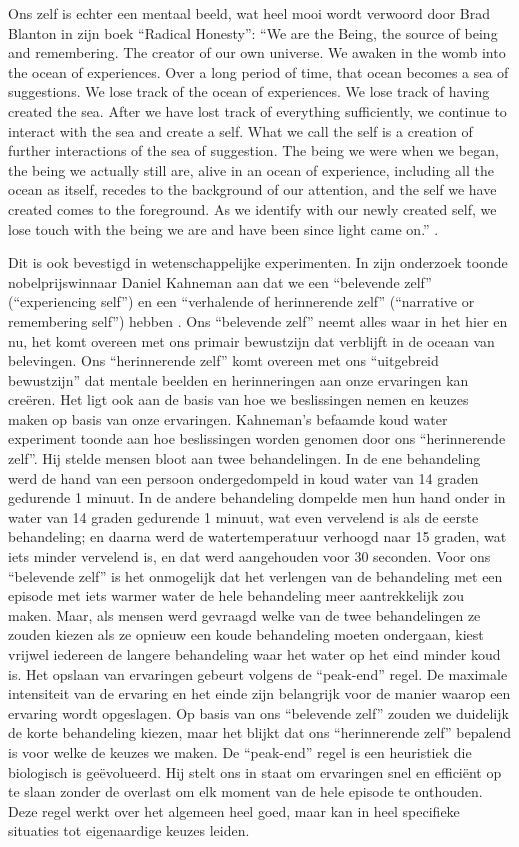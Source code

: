 \documentclass[
  11pt,
]{book}
\begin{document}
Ons zelf is echter een mentaal beeld, wat heel mooi wordt verwoord door Brad Blanton in zijn boek ``Radical Honesty'': ``We are the Being, the source of being and remembering. The creator of our own universe. We awaken in the womb into the ocean of experiences. Over a long period of time, that ocean becomes a sea of suggestions. We lose track of the ocean of experiences. We lose track of having created the sea. After we have lost track of everything sufficiently, we continue to interact with the sea and create a self. What we call the self is a creation of further interactions of the sea of suggestion. The being we were when we began, the being we actually still are, alive in an ocean of experience, including all the ocean as itself, recedes to the background of our attention, and the self we have created comes to the foreground. As we identify with our newly created self, we lose touch with the being we are and have been since light came on.'' \citep{Blanton1996}.

Dit is ook bevestigd in wetenschappelijke experimenten. In zijn onderzoek toonde nobelprijswinnaar Daniel Kahneman aan dat we een ``belevende zelf'' (``experiencing self'') en een ``verhalende of herinnerende zelf'' (``narrative or remembering self'') hebben \citep{Kahneman2012}. Ons ``belevende zelf'' neemt alles waar in het hier en nu, het komt overeen met ons primair bewustzijn dat verblijft in de oceaan van belevingen. Ons ``herinnerende zelf'' komt overeen met ons ``uitgebreid bewustzijn'' dat mentale beelden en herinneringen aan onze ervaringen kan creëren. Het ligt ook aan de basis van hoe we beslissingen nemen en keuzes maken op basis van onze ervaringen. Kahneman's befaamde koud water experiment toonde aan hoe beslissingen worden genomen door ons ``herinnerende zelf''. Hij stelde mensen bloot aan twee behandelingen. In de ene behandeling werd de hand van een persoon ondergedompeld in koud water van 14 graden gedurende 1 minuut. In de andere behandeling dompelde men hun hand onder in water van 14 graden gedurende 1 minuut, wat even vervelend is als de eerste behandeling; en daarna werd de watertemperatuur verhoogd naar 15 graden, wat iets minder vervelend is, en dat werd aangehouden voor 30 seconden. Voor ons ``belevende zelf'' is het onmogelijk dat het verlengen van de behandeling met een episode met iets warmer water de hele behandeling meer aantrekkelijk zou maken. Maar, als mensen werd gevraagd welke van de twee behandelingen ze zouden kiezen als ze opnieuw een koude behandeling moeten ondergaan, kiest vrijwel iedereen de langere behandeling waar het water op het eind minder koud is. Het opslaan van ervaringen gebeurt volgens de ``peak-end'' regel. De maximale intensiteit van de ervaring en het einde zijn belangrijk voor de manier waarop een ervaring wordt opgeslagen. Op basis van ons ``belevende zelf'' zouden we duidelijk de korte behandeling kiezen, maar het blijkt dat ons ``herinnerende zelf'' bepalend is voor welke de keuzes we maken. De ``peak-end'' regel is een heuristiek die biologisch is geëvolueerd. Hij stelt ons in staat om ervaringen snel en efficiënt op te slaan zonder de overlast om elk moment van de hele episode te onthouden. Deze regel werkt over het algemeen heel goed, maar kan in heel specifieke situaties tot eigenaardige keuzes leiden.
\end{document}
